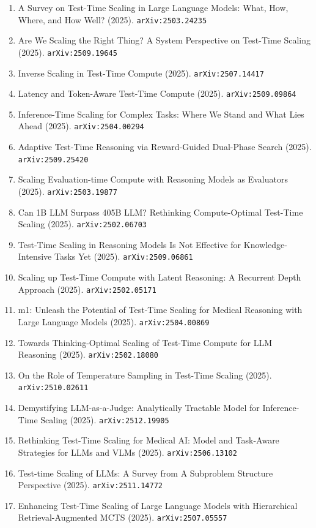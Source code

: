 \documentclass[11pt]{article}
\begin{document}
\begin{enumerate}
  \item A Survey on Test-Time Scaling in Large Language Models: What, How,
  Where, and How Well? (2025). \texttt{arXiv:2503.24235}
  \item Are We Scaling the Right Thing? A System Perspective on Test-Time Scaling (2025). \texttt{arXiv:2509.19645}
  \item Inverse Scaling in Test-Time Compute (2025). \texttt{arXiv:2507.14417}
  \item Latency and Token-Aware Test-Time Compute (2025). \texttt{arXiv:2509.09864}
  \item Inference-Time Scaling for Complex Tasks: Where We Stand and What Lies
  Ahead (2025). \texttt{arXiv:2504.00294}
  \item Adaptive Test-Time Reasoning via Reward-Guided Dual-Phase Search (2025). \texttt{arXiv:2509.25420}
  \item Scaling Evaluation-time Compute with Reasoning Models as Evaluators (2025). \texttt{arXiv:2503.19877}
  \item Can 1B LLM Surpass 405B LLM? Rethinking Compute-Optimal Test-Time
  Scaling (2025). \texttt{arXiv:2502.06703}
  \item Test-Time Scaling in Reasoning Models Is Not Effective for Knowledge-Intensive Tasks Yet (2025). \texttt{arXiv:2509.06861}
  \item Scaling up Test-Time Compute with Latent Reasoning: A Recurrent Depth
  Approach (2025). \texttt{arXiv:2502.05171}
  \item m1: Unleash the Potential of Test-Time Scaling for Medical Reasoning with Large Language Models (2025). \texttt{arXiv:2504.00869}
  \item Towards Thinking-Optimal Scaling of Test-Time Compute for LLM Reasoning (2025). \texttt{arXiv:2502.18080}
  \item On the Role of Temperature Sampling in Test-Time Scaling (2025). \texttt{arXiv:2510.02611}
  \item Demystifying LLM-as-a-Judge: Analytically Tractable Model for Inference-Time Scaling (2025). \texttt{arXiv:2512.19905}
  \item Rethinking Test-Time Scaling for Medical AI: Model and Task-Aware Strategies for LLMs and VLMs (2025). \texttt{arXiv:2506.13102}
  \item Test-time Scaling of LLMs: A Survey from A Subproblem Structure Perspective (2025). \texttt{arXiv:2511.14772}
  \item Enhancing Test-Time Scaling of Large Language Models with Hierarchical Retrieval-Augmented MCTS (2025). \texttt{arXiv:2507.05557}

\end{enumerate}
\end{document}
